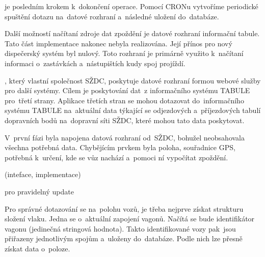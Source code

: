  je posledním krokem k~dokončení operace. Pomocí CRONu vytvoříme periodické spuštění dotazu na~datové rozhraní a~následné uložení do~databáze.



Další možností načítaní zdroje dat zpoždění je datové rozhraní informační tabule. Tato část implementace nakonec nebyla realizována. Její přínos pro nový dispečerský systém byl nulový. Toto rozhraní je primárně  využito k~načítaní informaci o~zastávkách a~nástupištích kudy spoj projíždí.

, který vlastní společnost SŽDC, poskytuje datové rozhraní formou webové služby pro další systémy. Cílem je poskytování dat~z informačního systému TABULE pro~třetí strany. Aplikace třetích stran se mohou dotazovat do~informačního systému TABULE na~aktuální data týkající se odjezdových a~příjezdových tabulí dopravních bodů na~dopravní síti SŽDC, které mohou tato data poskytovat.

V~první fázi byla napojena datová rozhraní od~SŽDC, bohužel neobsahovala všechna potřebná data. Chybějícím prvkem byla poloha, souřadnice GPS, potřebná k~určení, kde se vůz nachází a~pomoci ní vypočítat zpoždění.

 (inteface, implementace)
	
	
 pro pravidelný update


Pro správné dotazování se na~polohu vozů, je třeba nejprve získat strukturu složení vlaku. Jedna se o~aktuální zapojení vagonů. Načítá se bude identifikátor vagonu (jedinečná stringová hodnota). Takto identifikované vozy pak~jsou přiřazeny jednotlivým spojům a~uloženy do~databáze. Podle nich lze přesně získat data o~poloze.

	
	
	
	
